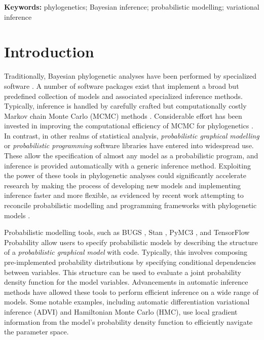 \documentclass{article}
\begin{document}
\medskip
\noindent\textbf{Keywords: }phylogenetics; Bayesian inference; probabilistic modelling; variational inference

\section{Introduction}

Traditionally, Bayesian phylogenetic analyses have been performed by specialized software \cite{huelsenbeck2001mrbayes, lartillot2009phylobayes, drummond2012bayesian}. A number of software packages exist that implement a broad but predefined collection of models and associated specialized inference methods. Typically, inference is handled by carefully crafted but computationally costly Markov chain Monte Carlo (MCMC) methods \cite{metropolis1953equation, hastings1970monte}. Considerable effort has been invested in improving the computational efficiency of MCMC for phylogenetics \cite{mateiu2006inferring, lakner2008efficiency, hohna2012guided, zhang2020improving}. In contrast, in other realms of statistical analysis, \textit{probabilistic graphical modelling} or \textit{probabilistic programming} software libraries have entered into widespread use. These allow the specification of almost any model as a probabilistic program, and inference is provided automatically with a generic inference method. Exploiting the power of these tools in phylogenetic analyses could significantly accelerate research by making the process of developing new models and implementing inference faster and more flexible, as evidenced by recent work attempting to reconcile probabilistic modelling and programming frameworks with phylogenetic models \cite{fourment2019evaluating, ronquist2021universal}.

Probabilistic modelling tools, such as BUGS \cite{lunn2000winbugs}, Stan \cite{carpenter2017stan}, PyMC3 \cite{salvatier2016probabilistic}, and TensorFlow Probability \cite{dillon2017tensorflow} allow users to specify probabilistic models by describing the structure of a \textit{probabilistic graphical model} with code. Typically, this involves composing pre-implemented probability distributions by specifying conditional dependencies between variables. This structure can be used to evaluate a joint probability density function for the model variables. Advancements in automatic inference methods have allowed these tools to perform efficient inference on a wide range of models. Some notable examples, including automatic differentiation variational inference \cite{kucukelbir2017automatic} (ADVI) and Hamiltonian Monte Carlo \cite{duane1987hybrid} (HMC), use local gradient information from the model's probability density function to efficiently navigate the parameter space.
\end{document}
